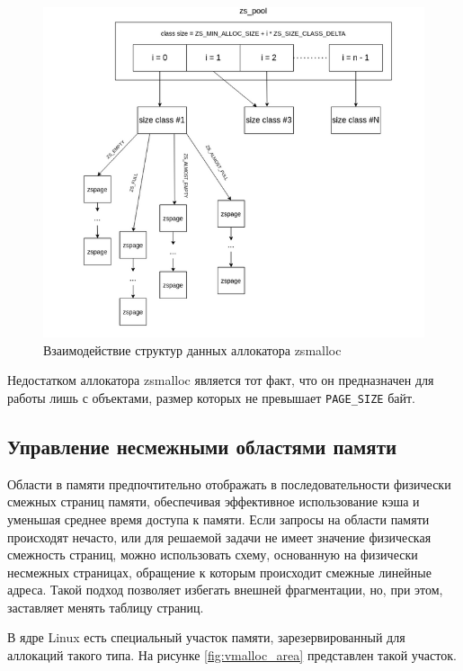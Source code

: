 \begin{figure}[h]
	\centering
	\includegraphics[width=\textwidth]{img/zsmalloc_full.png}
	\caption{Взаимодействие структур данных аллокатора zsmalloc}
	\label{fig:zsmalloc_full}
\end{figure}

Недостатком аллокатора zsmalloc является тот факт, что он предназначен для работы лишь с объектами, размер которых не превышает \texttt{PAGE\_SIZE} байт.

\subsection{Управление несмежными областями памяти}

Области в памяти предпочтительно отображать в последовательности физически смежных страниц памяти, обеспечивая эффективное использование кэша и уменьшая среднее время доступа к памяти. Если запросы на области памяти происходят нечасто, или для решаемой задачи не имеет значение физическая смежность страниц, можно использовать схему, основанную на физически несмежных страницах, обращение к которым происходит смежные линейные адреса. Такой подход позволяет избегать внешней фрагментации, но, при этом, заставляет менять таблицу страниц.

В ядре Linux есть специальный участок памяти, зарезервированный для аллокаций такого типа. На рисунке \ref{fig:vmalloc_area} представлен такой участок. 

